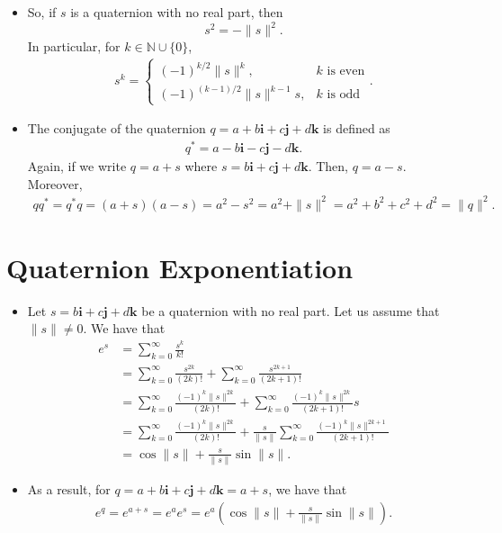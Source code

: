 \documentclass[10pt]{article}
\newcommand{\ve}[1]{\mathbf{#1}}
\begin{document}
\begin{itemize}
    \item So, if $s$ is a quaternion with no real part, then $$s^2 = -\|s\|^2.$$
    In particular, for $k \in \mathbb{N} \cup \{0\}$,
    \begin{align*}
        s^k = \begin{cases}
            (-1)^{k/2} \|s\|^{k}, & \mbox{$k$ is even} \\
            (-1)^{(k-1)/2} \|s\|^{k-1} s, & \mbox{$k$ is odd}
        \end{cases}.
    \end{align*}

    \item The conjugate of the quaternion $q = a + b\ve{i} + c\ve{j} + d\ve{k}$ is defined as
    \begin{align*}
        q^* = a - b\ve{i} - c\ve{j} - d\ve{k}.
    \end{align*}
    Again, if we write $q = a + s$ where $s = b\ve{i} + c\ve{j} + d\ve{k}$. Then, $q = a - s$. Moreover,
    \begin{align*}
        qq^* = q^*q = (a + s)(a - s) = a^2 - s^2 = a^2 + \| s \|^2 = a^2 + b^2 + c^2 + d^2 = \|q\|^2.
    \end{align*}    
\end{itemize}

\section{Quaternion Exponentiation}

\begin{itemize}
    \item Let $s = b\ve{i} + c\ve{j} + d\ve{k}$ be a quaternion with no real part. Let us assume that $\| s \| \neq 0$. We have that
    \begin{align*}
        e^s
        &= \sum_{k=0}^\infty \frac{s^k}{k!} \\
        &= \sum_{k=0}^\infty \frac{s^{2k}}{(2k)!} + \sum_{k=0}^\infty \frac{s^{2k+1}}{(2k+1)!} \\
        &= \sum_{k=0}^\infty \frac{(-1)^k \|s\|^{2k}}{(2k)!} + \sum_{k=0}^\infty \frac{(-1)^k \|s\|^{2k}}{(2k+1)!} s \\
        &= \sum_{k=0}^\infty \frac{(-1)^k \|s\|^{2k}}{(2k)!} + \frac{s}{\| s \|} \sum_{k=0}^\infty \frac{(-1)^k \|s\|^{2k+1}}{(2k+1)!}  \\
        &= \cos \| s \| + \frac{s}{\| s \|} \sin \| s \|.
    \end{align*}

    \item As a result, for $q = a + b\ve{i} + c\ve{j} + d\ve{k} = a + s$, we have that
    \begin{align*}
        e^q = e^{a+s} = e^a e^s = e^a \left( \cos \| s \| + \frac{s}{\| s \|} \sin \| s \| \right).
    \end{align*}
\end{itemize}
\end{document}

